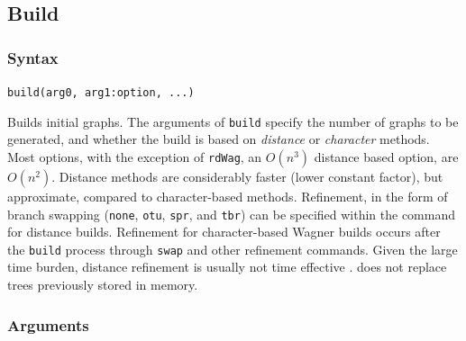 \subsection{Build}
	\subsubsection{Syntax}
		\texttt{build(arg0, arg1:option, ...)}\\
	
	\begin{phygdescription}
		{Builds initial graphs. The arguments of \texttt{build} specify the number of graphs 
		to be generated, and whether the build is based on \textit{distance} or \textit{character} 
		methods. Most options, with the exception of \texttt{rdWag}, an $O(n^3)$ distance based 
		option, are $O(n^2)$. Distance methods are considerably faster (lower constant 
		factor), but approximate, compared to character-based methods. Refinement, in the form 
		of branch swapping (\texttt{none}, \texttt{otu}, \texttt{spr}, and \texttt{tbr}) can be 
		specified within the command for distance builds. Refinement for character-based 
		Wagner builds occurs after the \texttt{build} process through \texttt{swap} and other
		refinement commands. Given the large time burden, distance refinement is usually 
		not time effective \citep{Wheeler2021}. \phyg does not replace trees previously 
		stored in memory.}
	\end{phygdescription}
		
	\subsubsection{Arguments}

